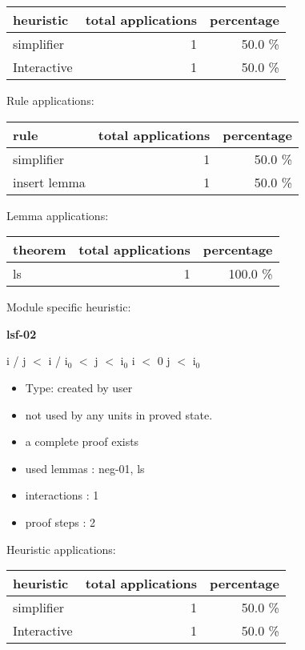 \documentclass[a4paper]{article}
\begin{document}
\begin{supertabular}{l|r|r}
heuristic	& total applications & percentage \\ \hline
simplifier & 1 & 50.0 \% \\
Interactive & 1 & 50.0 \% \\

\end{supertabular}

Rule applications:

\begin{supertabular}{l|r|r}
rule	        & total applications & percentage \\ \hline
simplifier & 1 & 50.0 \% \\
insert lemma & 1 & 50.0 \% \\

\end{supertabular}

Lemma applications:

\begin{supertabular}{l|r|r}
theorem	        & total applications & percentage \\ \hline
ls & 1 & 100.0 \% \\

\end{supertabular}

Module specific heuristic:

\pagebreak

{\LARGE\bf lsf-02}\label{lemma-lsf-02}

\medskip

 \Fol i / j $<$ i / $\mbox{i}_{0}$  $<$ j  $<$ $\mbox{i}_{0}$ \And i $<$ 0 \Imp j $<$ $\mbox{i}_{0}$

\begin{itemize}

\item Type: created by user

\item not used by any units in proved state.
\item       a complete proof exists
\item       used lemmas  : neg-01, ls
\item       interactions : 1
\item       proof steps  : 2
\end{itemize}

\medskip


Heuristic applications:

\begin{supertabular}{l|r|r}
heuristic	& total applications & percentage \\ \hline
simplifier & 1 & 50.0 \% \\
Interactive & 1 & 50.0 \% \\

\end{supertabular}
\end{document}
